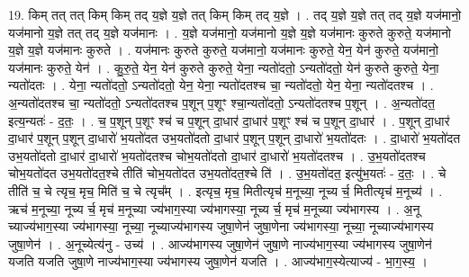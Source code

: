 \documentclass[17pt]{extarticle}
\begin{document}
19. किम् तत् तत् किम् किम् तद् य॒ज्ञे य॒ज्ञे तत् किम् किम् तद् य॒ज्ञे । . तद् य॒ज्ञे य॒ज्ञे तत् तद् य॒ज्ञे यज॑मानो॒ यज॑मानो य॒ज्ञे तत् तद् य॒ज्ञे यज॑मानः । . य॒ज्ञे यज॑मानो॒ यज॑मानो य॒ज्ञे य॒ज्ञे यज॑मानः कुरुते कुरुते॒ यज॑मानो य॒ज्ञे य॒ज्ञे यज॑मानः कुरुते । . यज॑मानः कुरुते कुरुते॒ यज॑मानो॒ यज॑मानः कुरुते॒ येन॒ येन॑ कुरुते॒ यज॑मानो॒ यज॑मानः कुरुते॒ येन॑ । . कु॒रु॒ते॒ येन॒ येन॑ कुरुते कुरुते॒ येना॒ न्यतो॑दतो॒ ऽन्यतो॑दतो॒ येन॑ कुरुते कुरुते॒ येना॒ न्यतो॑दतः । . येना॒ न्यतो॑दतो॒ ऽन्यतो॑दतो॒ येन॒ येना॒ न्यतो॑दतश्च चा॒ न्यतो॑दतो॒ येन॒ येना॒ न्यतो॑दतश्च । . अ॒न्यतो॑दतश्च चा॒ न्यतो॑दतो॒ ऽन्यतो॑दतश्च प॒शून् प॒शूꣳ श्चा॒न्यतो॑दतो॒ ऽन्यतो॑दतश्च प॒शून् । . अ॒न्यतो॑दत॒ इत्य॒न्यतः॑ - द॒तः॒ । . च॒ प॒शून् प॒शूꣳ श्च॑ च प॒शून् दा॒धार॑ दा॒धार॑ प॒शूꣳ श्च॑ च प॒शून् दा॒धार॑ । . प॒शून् दा॒धार॑ दा॒धार॑ प॒शून् प॒शून् दा॒धारो॑ भ॒यतो॑दत उभ॒यतो॑दतो दा॒धार॑ प॒शून् प॒शून् दा॒धारो॑ भ॒यतो॑दतः । . दा॒धारो॑ भ॒यतो॑दत उभ॒यतो॑दतो दा॒धार॑ दा॒धारो॑ भ॒यतो॑दतश्च चोभ॒यतो॑दतो दा॒धार॑ दा॒धारो॑ भ॒यतो॑दतश्च । . उ॒भ॒यतो॑दतश्च चोभ॒यतो॑दत उभ॒यतो॑दत॒श्चे तीति॑ चोभ॒यतो॑दत उभ॒यतो॑दत॒श्चे ति॑ । . उ॒भ॒यतो॑दत॒ इत्यु॑भ॒यतः॑ - द॒तः॒ । . चे तीति॑ च॒ चे त्यृच॒ मृच॒ मिति॑ च॒ चे त्यृच᳚म् । . इत्यृच॒ मृच॒ मितीत्यृच॑ म॒नूच्या॒ नूच्य र्च॒ मितीत्यृच॑ म॒नूच्य॑ । . ऋच॑ म॒नूच्या॒ नूच्य र्च॒ मृच॑ म॒नूच्या ज्य॑भाग॒स्या ज्य॑भागस्या॒ नूच्य र्च॒ मृच॑ म॒नूच्या ज्य॑भागस्य । . अ॒नू च्याज्य॑भाग॒स्या ज्य॑भागस्या॒ नूच्या॒ नूच्याज्य॑भागस्य जुषा॒णेन॑ जुषा॒णेना ज्य॑भागस्या॒ नूच्या॒ नूच्याज्य॑भागस्य जुषा॒णेन॑ । . अ॒नूच्येत्य॑नु - उच्य॑ । . आज्य॑भागस्य जुषा॒णेन॑ जुषा॒णे नाज्य॑भाग॒स्या ज्य॑भागस्य जुषा॒णेन॑ यजति यजति जुषा॒णे नाज्य॑भाग॒स्या ज्य॑भागस्य जुषा॒णेन॑ यजति । . आज्य॑भाग॒स्येत्याज्य॑ - भा॒ग॒स्य॒ । \newline
\end{document}
